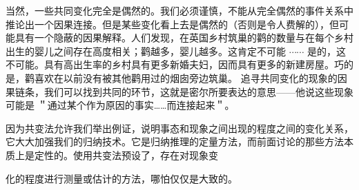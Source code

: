 当然，一些共同变化完全是偶然的。我们必须谨慎，不能从完全偶然的事件关系中推论出一个因果连接。但是某些变化看上去是偶然的（否则是令人费解的），但可能具有一个隐蔽的因果解释。人们发现，在英国乡村筑巢的鹳的数量与在每个乡村出生的婴儿之间存在高度相关；鹳越多，婴儿越多。这肯定不可能 $\cdots \cdots$ 是的，这不可能。具有高出生率的乡村具有更多新婚夫妇，因而具有更多的新建房屋。巧的是，鹳喜欢在以前没有被其他鹳用过的烟囱旁边筑巢。\cite{matthews1999} 追寻共同变化的现象的因果链条，我们可以找到共同的环节，这就是密尔所要表达的意思——他说这些现象可能是 ＂通过某个作为原因的事实……而连接起来＂。

因为共变法允许我们举出例证，说明事态和现象之间出现的程度之间的变化关系，它大大加强我们的归纳技术。它是归纳推理的定量方法，而前面讨论的那些方法本质上是定性的。使用共变法预设了，存在对现象变

化的程度进行测量或估计的方法，哪怕仅仅是大致的。

